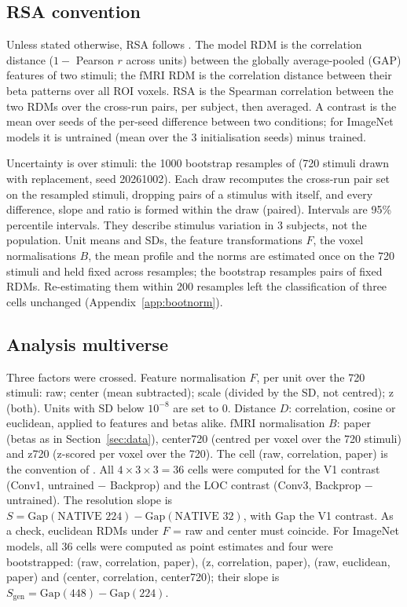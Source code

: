 \documentclass[10pt]{article}
\begin{document}
\subsection{RSA convention}
\label{sec:rsa}

Unless stated otherwise, RSA follows \citet{evalres}. The model RDM is the
correlation distance ($1 -$ Pearson $r$ across units) between the globally average-pooled
(GAP) features of two stimuli; the fMRI RDM is the correlation distance between their
beta patterns over all ROI voxels. RSA is the Spearman correlation between the two RDMs
over the cross-run pairs, per subject, then averaged. A
contrast is the mean over seeds of the per-seed difference between two conditions; for
ImageNet models it is untrained (mean over the 3 initialisation seeds) minus trained.

Uncertainty is over stimuli: the 1000 bootstrap resamples of \citet{evalres} (720
stimuli drawn with replacement, seed 20261002). Each draw recomputes the cross-run pair
set on the resampled stimuli, dropping pairs of a stimulus with itself, and every
difference, slope and ratio is formed within the draw (paired). Intervals are 95\%
percentile intervals. They describe stimulus variation in 3 subjects, not the population. Unit means and SDs, the feature transformations $F$, the voxel normalisations $B$, the mean profile and the norms are estimated once on the 720 stimuli and held fixed across resamples; the bootstrap resamples pairs of fixed RDMs. Re-estimating them within 200 resamples left the classification of three cells unchanged (Appendix~\ref{app:bootnorm}).

\subsection{Analysis multiverse}
\label{sec:mvmethods}

Three factors were crossed. Feature normalisation $F$, per unit over the 720 stimuli:
raw; center (mean subtracted); scale (divided by the SD, not centred); z (both). Units
with SD below $10^{-8}$ are set to 0. Distance $D$: correlation, cosine or euclidean,
applied to features and betas alike. fMRI normalisation $B$: paper (betas
as in Section~\ref{sec:data}), center720 (centred per voxel over the 720 stimuli) and
z720 (z-scored per voxel over the 720). The cell (raw, correlation, paper) is the
convention of \citet{evalres}. All $4 \times 3 \times 3 = 36$ cells were computed for
the V1 contrast (Conv1, untrained $-$ Backprop) and the LOC contrast (Conv3, Backprop
$-$ untrained). The resolution slope is
$S = \mathrm{Gap}(\text{NATIVE } 224) - \mathrm{Gap}(\text{NATIVE } 32)$, with Gap the V1
contrast. As a check, euclidean RDMs under $F$ = raw and center must coincide. For
ImageNet models, all 36 cells were computed as point estimates and four were
bootstrapped: (raw, correlation, paper), (z, correlation, paper), (raw, euclidean,
paper) and (center, correlation, center720); their slope is
$S_{\mathrm{gen}} = \mathrm{Gap}(448) - \mathrm{Gap}(224)$.
\end{document}

